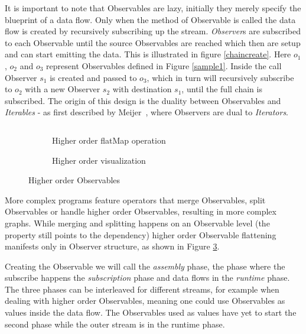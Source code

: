 It is important to note that Observables are lazy, initially they merely specify the blueprint of a data flow. Only when the  method of Observable is called the data flow is created by recursively subscribing up the stream. \textit{Observer}s are subscribed to each Observable until the source Observables are reached which then are setup and can start emitting the data.
This is illustrated in figure \ref{chaincreate}. Here $o_1$, $o_2$ and $o_3$ represent Observables defined in Figure \ref{sample1}. Inside the  call Observer $s_1$ is created and passed to $o_3$, which in turn will recursively subscribe to $o_2$ with a new Observer $s_2$ with destination $s_1$, until the full chain is subscribed.
The origin of this design is the duality between Observables and \textit{Iterables} - as first described by Meijer~\cite{meijer2010subject}, where Observers are dual to \textit{Iterators}.

\begin{figure}

\begin{subfigure}[a]{\columnwidth}
\inputminted[tabsize=2]{javascript}{listings/sample3.js}	
\caption{Higher order flatMap operation}
\label{sample3}
\end{subfigure}

\begin{subfigure}[b]{\columnwidth}
\centering

\caption{Higher order visualization}
\label{chainhigher}
\end{subfigure}

\caption{Higher order Observables}

\end{figure}

More complex programs feature operators that merge Observables, split Observables or handle higher order Observables, resulting in more complex graphs. While merging and splitting happens on an Observable level (the  property still points to the dependency) higher order Observable flattening manifests only in Observer structure, as shown in Figure \ref{chainhigher}.

Creating the Observable we will call the \textit{assembly} phase, the phase where the subscribe happens the \textit{subscription} phase and data flows in the \textit{runtime} phase. The three phases can be interleaved for different streams, for example when dealing with higher order Observables,  meaning one could use Observables as values inside the data flow. The Observables used as values have yet to start the second phase while the outer stream is in the runtime phase.
